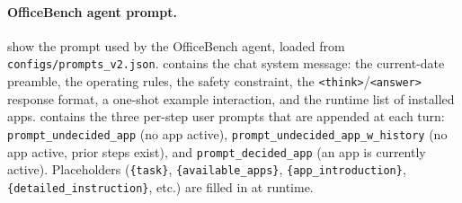 \paragraph{OfficeBench agent prompt.}
 show the prompt used by the OfficeBench agent, loaded from \texttt{configs/prompts\_v2.json}.  contains the chat system message: the current-date preamble, the operating rules, the safety constraint, the \texttt{<think>}/\texttt{<answer>} response format, a one-shot example interaction, and the runtime list of installed apps.  contains the three per-step user prompts that are appended at each turn: \texttt{prompt\_undecided\_app} (no app active), \texttt{prompt\_undecided\_app\_w\_history} (no app active, prior steps exist), and \texttt{prompt\_decided\_app} (an app is currently active). Placeholders (\texttt{\{task\}}, \texttt{\{available\_apps\}}, \texttt{\{app\_introduction\}}, \texttt{\{detailed\_instruction\}}, etc.) are filled in at runtime.


